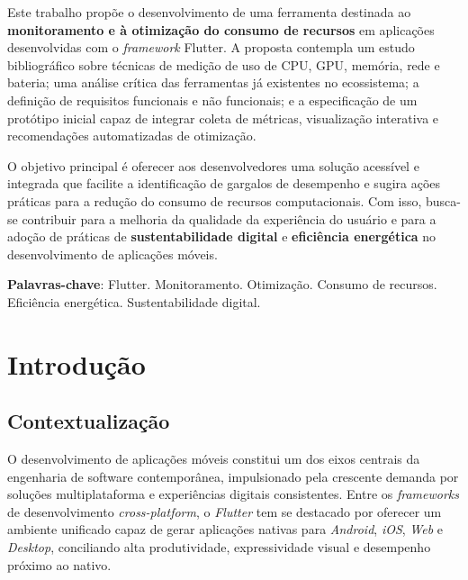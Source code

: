 \documentclass[12pt,a4paper,oneside]{abntex2}
\begin{document}
\newpage

\renewcommand{\resumoname}{Resumo}
\begin{resumo}
\noindent
Este trabalho propõe o desenvolvimento de uma ferramenta destinada ao \textbf{monitoramento e à otimização do consumo de recursos} em aplicações desenvolvidas com o \textit{framework} Flutter. A proposta contempla um estudo bibliográfico sobre técnicas de medição de uso de CPU, GPU, memória, rede e bateria; uma análise crítica das ferramentas já existentes no ecossistema; a definição de requisitos funcionais e não funcionais; e a especificação de um protótipo inicial capaz de integrar coleta de métricas, visualização interativa e recomendações automatizadas de otimização.

O objetivo principal é oferecer aos desenvolvedores uma solução acessível e integrada que facilite a identificação de gargalos de desempenho e sugira ações práticas para a redução do consumo de recursos computacionais. Com isso, busca-se contribuir para a melhoria da qualidade da experiência do usuário e para a adoção de práticas de \textbf{sustentabilidade digital} e \textbf{eficiência energética} no desenvolvimento de aplicações móveis.

\textbf{Palavras-chave}: Flutter. Monitoramento. Otimização. Consumo de recursos. Eficiência energética. Sustentabilidade digital.
\end{resumo}

\newpage
\tableofcontents
\newpage

\chapter{Introdução}
\section{Contextualização}
O desenvolvimento de aplicações móveis constitui um dos eixos centrais da engenharia de software contemporânea, impulsionado pela crescente demanda por soluções multiplataforma e experiências digitais consistentes. Entre os \textit{frameworks} de desenvolvimento \textit{cross-platform}, o \textit{Flutter} tem se destacado por oferecer um ambiente unificado capaz de gerar aplicações nativas para \textit{Android}, \textit{iOS}, \textit{Web} e \textit{Desktop}, conciliando alta produtividade, expressividade visual e desempenho próximo ao nativo.
\end{document}
